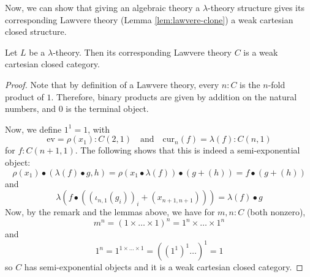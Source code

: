 Now, we can show that giving an algebraic theory a $ \lambda $-theory structure gives its corresponding Lawvere theory (Lemma \ref{lem:lawvere-clone}) a weak cartesian closed structure.
\begin{lemma}
  Let $ L $ be a $ \lambda $-theory. Then its corresponding Lawvere theory $ C $ is a weak cartesian closed category.
\end{lemma}
\begin{proof}
  Note that by definition of a Lawvere theory, every $ n: C $ is the $ n $-fold product of $ 1 $. Therefore, binary products are given by addition on the natural numbers, and $ 0 $ is the terminal object.

  Now, we define $ 1^1 = 1 $, with
  \[ \mathrm{ev} = \rho(x_1) : C(2, 1) \quad \text{and} \quad \mathrm{cur}_n(f) = \lambda(f) : C(n, 1) \]
  for $ f: C(n + 1, 1) $. The following shows that this is indeed a semi-exponential object:
  \[
    \rho(x_1) \bullet (\lambda(f) \bullet g, h) = \rho(x_1 \bullet \lambda(f)) \bullet (g + (h)) = f \bullet (g + (h)) \]
  and
  \[ \lambda(f \bullet ((\iota_{n, 1}(g_i))_i + (x_{n + 1, n + 1}))) = \lambda(f) \bullet g \]
  Now, by the remark and the lemmas above, we have for $ m, n: C $ (both nonzero),
  \[ m^n = (1 \times \dots \times 1)^n = 1^n \times \dots \times 1^n \]
  and
  \[ 1^n = 1^{1 \times \dots \times 1} = ((1^1)^1\dots)^1 = 1 \]
  so $ C $ has semi-exponential objects and it is a weak cartesian closed category.
\end{proof}
